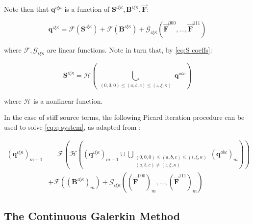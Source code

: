 \documentclass[twoside,english,final,5p,times,twocolumn]{elsarticle}
\begin{document}
Note then that $\boldsymbol{q}^{\iota\xi\kappa}$ is a function of
$\boldsymbol{S}^{\iota\xi\kappa},\boldsymbol{B}^{\iota\xi\kappa},\overrightarrow{\boldsymbol{F}}$:

\begin{equation}
\boldsymbol{q}^{\iota\xi\kappa}=\mathcal{F}\left(\boldsymbol{S}^{\iota\xi\kappa}\right)+\mathcal{F}\left(\boldsymbol{B}^{\iota\xi\kappa}\right)+\mathcal{G_{\iota\xi\kappa}}\left(\overrightarrow{\boldsymbol{F}}^{000},\ldots,\overrightarrow{\boldsymbol{F}}^{111}\right)
\end{equation}

where $\mathcal{F},\mathcal{G_{\iota\xi\kappa}}$ are linear functions.
Note in turn that, by \eqref{eq:S coeffs}:

\begin{equation}
\boldsymbol{S}^{\iota\xi\kappa}=\mathcal{H}\left(\bigcup_{\begin{array}{c}
\left(0,0,0\right)\leq\left(a,b,c\right)\leq\left(\iota,\xi,\kappa\right)\end{array}}\boldsymbol{q}^{abc}\right)
\end{equation}

where $\mathcal{H}$ is a nonlinear function.

In the case of stiff source terms, the following Picard iteration
procedure can be used to solve \eqref{eq:q system}, as adapted from
\citet{Montecinos2017}:

\begin{align}
\left(\boldsymbol{q}^{\iota\xi\kappa}\right)_{m+1} & =\mathcal{F}\left(\mathcal{H}\left(\left(\boldsymbol{q}^{\iota\xi\kappa}\right)_{m+1}\cup\bigcup_{\begin{array}{c}
\left(0,0,0\right)\leq\left(a,b,c\right)\leq\left(\iota,\xi,\kappa\right)\\
\left(a,b,c\right)\neq\left(\iota,\xi,\kappa\right)
\end{array}}\left(\boldsymbol{q}^{abc}\right)_{m}\right)\right)\\
 & +\mathcal{F}\left(\left(\boldsymbol{B}^{\iota\xi\kappa}\right)_{m}\right)+\mathcal{G_{\iota\xi\kappa}}\left(\left(\overrightarrow{\boldsymbol{F}}^{000}\right)_{m},\ldots,\left(\overrightarrow{\boldsymbol{F}}^{111}\right)_{m}\right)\nonumber 
\end{align}

\subsection{The Continuous Galerkin Method}
\end{document}
